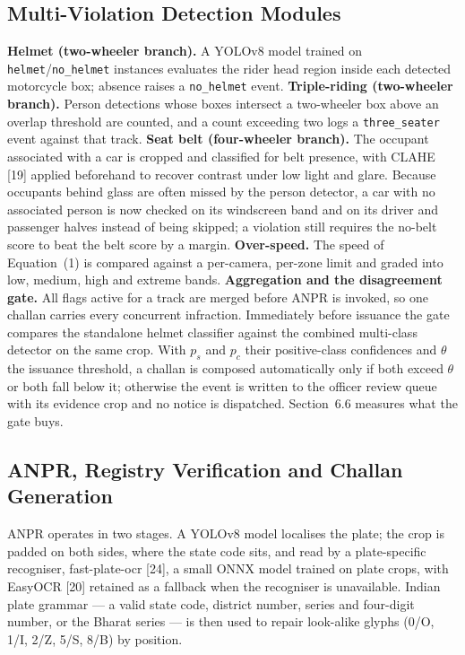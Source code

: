 \documentclass[10pt,a4paper,twocolumn]{article}
\newcommand{\code}[1]{\texttt{#1}}
\begin{document}
\subsection{Multi-Violation Detection Modules}
\textbf{Helmet (two-wheeler branch).} A YOLOv8 model trained on \code{helmet}/\code{no\_helmet} instances evaluates the
rider head region inside each detected motorcycle box; absence raises a \code{no\_helmet} event.
\textbf{Triple-riding (two-wheeler branch).} Person detections whose boxes intersect a two-wheeler box above an overlap
threshold are counted, and a count exceeding two logs a \code{three\_seater} event against that track.
\textbf{Seat belt (four-wheeler branch).} The occupant associated with a car is cropped and classified for belt
presence, with CLAHE [19] applied beforehand to recover contrast under low light and glare. Because occupants behind
glass are often missed by the person detector, a car with no associated person is now checked on its windscreen band
and on its driver and passenger halves instead of being skipped; a violation still requires the no-belt score to beat
the belt score by a margin.
\textbf{Over-speed.} The speed of Equation~(1) is compared against a per-camera, per-zone limit and graded into low,
medium, high and extreme bands.
\textbf{Aggregation and the disagreement gate.} All flags active for a track are merged before ANPR is invoked, so one
challan carries every concurrent infraction. Immediately before issuance the gate compares the standalone helmet
classifier against the combined multi-class detector on the same crop. With $p_s$ and $p_c$ their positive-class
confidences and $\theta$ the issuance threshold, a challan is composed automatically only if both exceed $\theta$ or
both fall below it; otherwise the event is written to the officer review queue with its evidence crop and no notice is
dispatched. Section~6.6 measures what the gate buys.

\subsection{ANPR, Registry Verification and Challan Generation}
ANPR operates in two stages. A YOLOv8 model localises the plate; the crop is padded on both sides, where the state
code sits, and read by a plate-specific recogniser, fast-plate-ocr [24], a small ONNX model trained on plate crops, with
EasyOCR [20] retained as a fallback when the recogniser is unavailable. Indian plate grammar --- a valid state code,
district number, series and four-digit number, or the Bharat series --- is then used to repair look-alike glyphs
(0/O, 1/I, 2/Z, 5/S, 8/B) by position.
\end{document}
